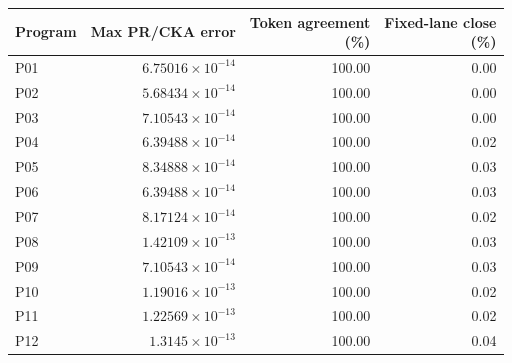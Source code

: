 \begin{center}\small
\begin{tabular}{@{}lrrr@{}}
\toprule
Program & Max PR/CKA error & \shortstack{Token agreement\\(\%)} & \shortstack{Fixed-lane close\\(\%)} \\
\midrule
P01 & $6.75016\times 10^{-14}$ & 100.00 & 0.00 \\
P02 & $5.68434\times 10^{-14}$ & 100.00 & 0.00 \\
P03 & $7.10543\times 10^{-14}$ & 100.00 & 0.00 \\
P04 & $6.39488\times 10^{-14}$ & 100.00 & 0.02 \\
P05 & $8.34888\times 10^{-14}$ & 100.00 & 0.03 \\
P06 & $6.39488\times 10^{-14}$ & 100.00 & 0.03 \\
P07 & $8.17124\times 10^{-14}$ & 100.00 & 0.02 \\
P08 & $1.42109\times 10^{-13}$ & 100.00 & 0.03 \\
P09 & $7.10543\times 10^{-14}$ & 100.00 & 0.03 \\
P10 & $1.19016\times 10^{-13}$ & 100.00 & 0.02 \\
P11 & $1.22569\times 10^{-13}$ & 100.00 & 0.02 \\
P12 & $1.3145\times 10^{-13}$ & 100.00 & 0.04 \\
\bottomrule
\end{tabular}
\end{center}
